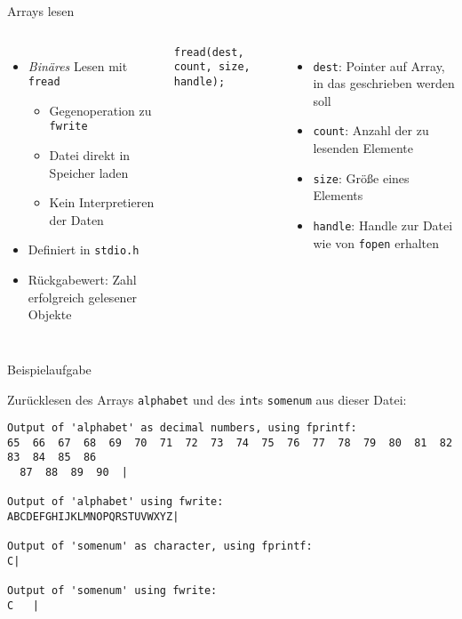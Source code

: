 \begin{frame}[fragile]{Arrays lesen}
%
\begin{columns}[T]
\begin{itemize}
\item \emph{Binäres} Lesen mit \texttt{fread}
\begin{itemize}
	\item Gegenoperation zu \texttt{fwrite}
	\item Datei direkt in Speicher laden
	\item Kein Interpretieren der Daten
\end{itemize}
\item Definiert in \texttt{stdio.h}
\item Rückgabewert: Zahl erfolgreich gelesener Objekte
\end{itemize}
%
\vspace{-10pt}
\begin{codebox}[Syntax]
\begin{verbatim}
fread(dest, count, size, handle);
\end{verbatim}
\end{codebox}
%
\begin{itemize}
\item \texttt{dest}: Pointer auf Array, in das geschrieben werden soll
\item \texttt{count}: Anzahl der zu lesenden Elemente
\item \texttt{size}: Größe eines Elements
\item \texttt{handle}: Handle zur Datei wie von \texttt{fopen} erhalten
\end{itemize}
\end{columns}
%
\end{frame}


\begin{frame}[fragile]{Beispielaufgabe}
%
\begin{center}
Zurücklesen des Arrays \texttt{alphabet} und des \texttt{int}s \texttt{somenum} aus dieser Datei:
\end{center}
%
\begin{cmdbox}[Quelldatei]
\begin{verbatim}
Output of 'alphabet' as decimal numbers, using fprintf:
65  66  67  68  69  70  71  72  73  74  75  76  77  78  79  80  81  82  83  84  85  86
  87  88  89  90  |

Output of 'alphabet' using fwrite:
ABCDEFGHIJKLMNOPQRSTUVWXYZ|

Output of 'somenum' as character, using fprintf:
C|

Output of 'somenum' using fwrite:
C   |
\end{verbatim}
\end{cmdbox}
%
\end{frame}

